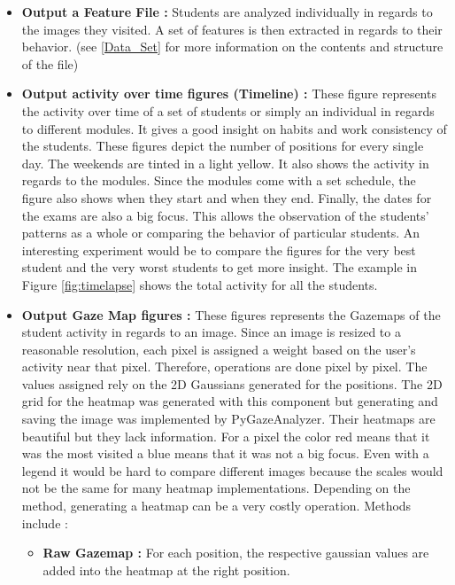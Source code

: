 \documentclass[a4paper,11pt]{report}
\numberwithin{figure}{section} %
\begin{document}
    \begin{itemize}
        \item[\textbullet] \textbf{Output a Feature File :} Students are analyzed individually in regards to the images they visited.
        A set of features is then extracted in regards to their behavior.
        (see \ref{Data_Set} for more information on the contents and structure of the file)
        \item[\textbullet] \textbf{Output activity over time figures (Timeline) :} These figure represents the activity over time of a set of students or simply an individual in regards to different modules.
        It gives a good insight on habits and work consistency of the students.
        These figures depict the number of positions for every single day.
        The weekends are tinted in a light yellow.
        It also shows the activity in regards to the modules.
        Since the modules come with a set schedule, the figure also shows when they start and when they end.
        Finally, the dates for the exams are also a big focus.
        This allows the observation of the students' patterns as a whole or comparing the behavior of particular students.
        An interesting experiment would be to compare the figures for the very best student and the very worst students to get more insight.
        The example in Figure \ref{fig:timelapse} shows the total activity for all the students.
        \item[\textbullet] \textbf{Output Gaze Map figures :} These figures represents the Gazemaps of the student activity in regards to an image.
        Since an image is resized to a reasonable resolution, each pixel is assigned a weight based on the user's activity near that pixel.
        Therefore, operations are done pixel by pixel.
        The values assigned rely on the 2D Gaussians generated for the positions.
        The 2D grid for the heatmap was generated with this component but generating and saving the image was implemented by PyGazeAnalyzer.
        Their heatmaps are beautiful but they lack information. For a pixel the color red means that it was the most visited a blue means that it was not a big focus.
        Even with a legend it would be hard to compare different images because the scales would not be the same for many heatmap implementations.
        Depending on the method, generating a heatmap can be a very costly operation.
        Methods include :
        \begin{itemize}
            \item \textbf{Raw Gazemap :} For each position, the respective gaussian values are added into the heatmap at the right position.

\end{itemize}
\end{itemize}
\end{document}
